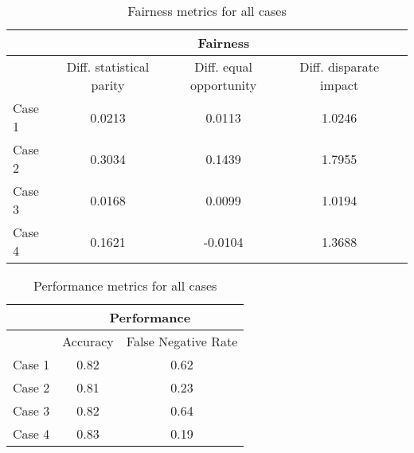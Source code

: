 \documentclass{article}
\begin{document}
\begin{table}[]
  \caption{Fairness metrics for all cases}
  \label{table5}
  \centering
\begin{tabular}{|l|c|c|c|l}
\hline
                             & \multicolumn{3}{c|}{Fairness}                                               \\ \hline
                             & Diff. statistical parity & Diff. equal opportunity & Diff. disparate impact \\ \hline
Case 1                    & 0.0213                   & 0.0113                  & 1.0246                 \\ \hline
Case 2                & 0.3034                   & 0.1439                  & 1.7955                 \\ \hline
Case 3            & 0.0168                   & 0.0099                  & 1.0194                 \\ \hline
Case 4 & 0.1621                   & -0.0104                 & 1.3688                 \\ \hline
\end{tabular}
\end{table}


\begin{table}[]
  \caption{Performance metrics for all cases}
  \label{table6}
  \centering
\begin{tabular}{|l|c|c|}
\hline
                             & \multicolumn{2}{c|}{Performance} \\ \hline
                             & Accuracy  & False Negative Rate  \\ \hline
Case 1                      & 0.82      & 0.62                 \\ \hline
Case 2                 & 0.81      & 0.23                 \\ \hline
Case 3          & 0.82      & 0.64                 \\ \hline
Case 4 & 0.83      & 0.19                 \\ \hline
\end{tabular}
\end{table}
\end{document}
